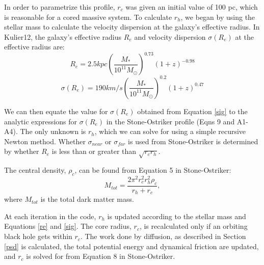 \documentclass[english, apj]{emulateapj}
\begin{document}
In order to parametrize this profile, $r_c$ was given an initial value of 100 pc, which is reasonable for a cored massive system.  To calculate $r_h$, we began by using the stellar mass to calculate the velocity dispersion at the galaxy's effective radius.  In Kulier12, the galaxy's effective radius $R_{e}$ and velocity dispersion $\sigma(R_e)$ at the effective radius are:
\begin{equation} \label{re}
R_{e} = 2.5 kpc\left(\frac{M_*}{10^{11}M_{\odot}}\right)^{0.73}(1+z)^{-0.98}
\end{equation}
\begin{equation} \label{sig}
\sigma(R_{e}) = 190km/s\left(\frac{M_{*}}{10^{11}M_{\odot}}\right)^{0.2}(1+z)^{0.47}
\end{equation}

We can then equate the value for $\sigma({R_e})$ obtained from Equation \ref{sig} to the analytic expressions for $\sigma(R_{e})$ in the Stone-Ostriker profile (Eqns 9 and A1-A4).  The only unknown is $r_h$, which we can solve for using a simple recursive Newton method.  Whether $\sigma_{near}$ or $\sigma_{far}$ is used from Stone-Ostriker is determined by whether $R_e$ is less than or greater than $\sqrt{r_c r_h}$.

The central density, $\rho_c$, can be found from Equation 5 in Stone-Ostriker:
\begin{equation} \label{rhoc}
M_{tot} = \frac{2\pi^2r_{c}^2r_{h}^2\rho_c}{r_h+r_c},
\end{equation}
where $M_{tot}$ is the total dark matter mass.

At each iteration in the code, $r_h$ is updated according to the stellar mass and Equations \ref{re} and \ref{sig}.  The core radius, $r_c$, is recalculated only if an orbiting black hole gets within $r_c$.  The work done by diffusion, as described in Section \ref{psd} is calculated, the total potential energy and dynamical friction are updated, and $r_c$ is solved for from Equation 8 in Stone-Ostriker.
\end{document}
